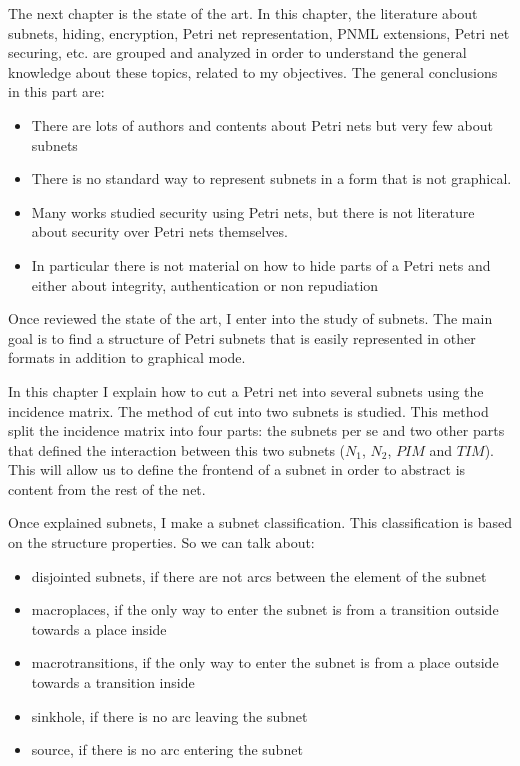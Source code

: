 The next chapter is the state of the art. In this chapter, the literature
about subnets, hiding, encryption, Petri net representation, PNML extensions,
Petri net securing, etc. are grouped and analyzed in order to understand the general knowledge about these topics, related to my objectives. The general conclusions in this part are:
\begin{itemize}
\item There are lots of authors and contents about Petri nets but very few
about subnets
\item There is no standard way to represent
subnets in a form that is not graphical.
\item Many works studied security using Petri nets, but there is not literature
about security over Petri nets themselves.
\item In particular there is not material on how to hide parts of a Petri nets and either about integrity, authentication or non repudiation
\end{itemize}
 
Once reviewed the state of the art, I enter into the study of subnets. The main goal is to find a structure of Petri subnets that is easily represented in other formats in addition to graphical mode.

In this chapter I explain how to cut a Petri net into several subnets using the incidence matrix. The method of cut into two subnets is studied. This method split the incidence matrix into four parts: the subnets per se and two other parts that defined the interaction between this two subnets ($N_1$,
$N_2$, $PIM$ and $TIM$). This will allow us to define the frontend of a subnet in order to abstract is content from the rest of the net.

Once explained subnets, I make a subnet classification. This classification is based on the structure properties. So we can talk about:

\begin{itemize}
\item disjointed subnets, if there are not arcs between the element of the
subnet
\item macroplaces, if the only way to enter the subnet is from a transition
outside towards a place inside
\item macrotransitions, if the only way to enter the subnet is from a place
outside towards a transition inside
\item sinkhole, if there is no arc leaving the subnet
\item source, if there is no arc entering the subnet
\end{itemize}

